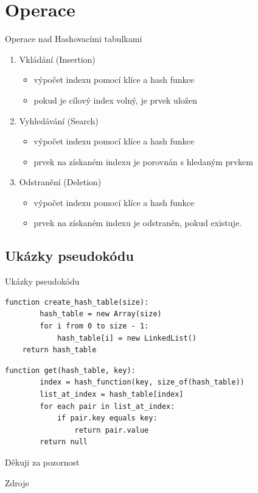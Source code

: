 \documentclass[10pt, hyperref={unicode}]{beamer}
\begin{document}
\section{Operace}
\begin{frame}{Operace nad Hashovacími tabulkami}

    \begin{enumerate}
        \item Vkládání (Insertion)
        \begin{itemize}
            \item výpočet indexu pomocí klíce a hash funkce
            \item pokud je cílový index volný, je prvek uložen
        \end{itemize}

        \item Vyhledávání (Search)
        \begin{itemize}
            \item výpočet indexu pomocí klíce a hash funkce
            \item prvek na získaném indexu je porovnán s hledaným prvkem
        \end{itemize}

        \item Odstranění (Deletion)
        \begin{itemize}
            \item výpočet indexu pomocí klíce a hash funkce
            \item prvek na získaném indexu je odstraněn, pokud existuje.
        \end{itemize}
    \end{enumerate}
    
\end{frame}
\subsection{Ukázky pseudokódu}
\begin{frame}[fragile]{Ukázky pseudokódu}

    \begin{lstlisting}[title=Function for creating and initializing a hash table]
    function create_hash_table(size):
        hash_table = new Array(size)
        for i from 0 to size - 1:
            hash_table[i] = new LinkedList()
    return hash_table
\end{lstlisting}

\begin{lstlisting}[title=Function to retrieve a value from the hash table given a key]
    function get(hash_table, key):
        index = hash_function(key, size_of(hash_table)) 
        list_at_index = hash_table[index]  
        for each pair in list_at_index:
            if pair.key equals key:
                return pair.value
        return null  
\end{lstlisting}

    
\end{frame}

\begin{frame}[s]
    \vfill
    \centering \Large Děkuji za pozornost
    \vfill
\end{frame}

\begin{frame}{Zdroje}
    
    
\end{frame}
\end{document}
